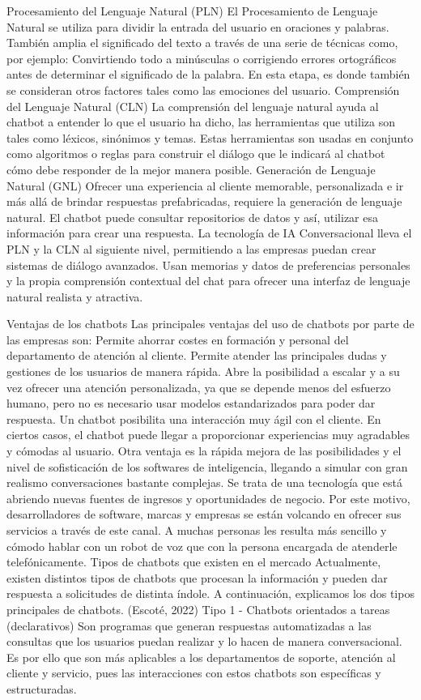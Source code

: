 Procesamiento del Lenguaje Natural (PLN)
El Procesamiento de Lenguaje Natural se utiliza para dividir la entrada del usuario en oraciones y palabras. También amplia el significado del texto a través de una serie de técnicas como, por ejemplo: Convirtiendo todo a minúsculas o corrigiendo errores ortográficos antes de determinar el significado de la palabra. En esta etapa, es donde también se consideran otros factores tales como las emociones del usuario.
Comprensión del Lenguaje Natural (CLN)
La comprensión del lenguaje natural ayuda al chatbot a entender lo que el usuario ha dicho, las herramientas que utiliza son tales como léxicos, sinónimos y temas. Estas herramientas son usadas en conjunto como algoritmos o reglas para construir el diálogo que le indicará al chatbot cómo debe responder de la mejor manera posible.
Generación de Lenguaje Natural (GNL)
Ofrecer una experiencia al cliente memorable, personalizada e ir más allá de brindar respuestas prefabricadas, requiere la generación de lenguaje natural. El chatbot puede consultar repositorios de datos y así, utilizar esa información para crear una respuesta.
La tecnología de IA Conversacional lleva el PLN y la CLN al siguiente nivel, permitiendo a las empresas puedan crear sistemas de diálogo avanzados.
Usan memorias y datos de preferencias personales y la propia comprensión contextual del chat para ofrecer una interfaz de lenguaje natural realista y atractiva.

Ventajas de los chatbots
Las principales ventajas del uso de chatbots por parte de las empresas son:
Permite ahorrar costes en formación y personal del departamento de atención al cliente.
Permite atender las principales dudas y gestiones de los usuarios de manera rápida.
Abre la posibilidad a escalar y a su vez ofrecer una atención personalizada, ya que se depende menos del esfuerzo humano, pero no es necesario usar modelos estandarizados para poder dar respuesta.
Un chatbot posibilita una interacción muy ágil con el cliente.
En ciertos casos, el chatbot puede llegar a proporcionar experiencias muy agradables y cómodas al usuario.
Otra ventaja es la rápida mejora de las posibilidades y el nivel de sofisticación de los softwares de inteligencia, llegando a simular con gran realismo conversaciones bastante complejas.
Se trata de una tecnología que está abriendo nuevas fuentes de ingresos y oportunidades de negocio. Por este motivo, desarrolladores de software, marcas y empresas se están volcando en ofrecer sus servicios a través de este canal.
A muchas personas les resulta más sencillo y cómodo hablar con un robot de voz que con la persona encargada de atenderle telefónicamente.
Tipos de chatbots que existen en el mercado
Actualmente, existen distintos tipos de chatbots que procesan la información y pueden dar respuesta a solicitudes de distinta índole. A continuación, explicamos los dos tipos principales de chatbots. (Escoté, 2022)
Tipo 1 - Chatbots orientados a tareas (declarativos)
Son programas que generan respuestas automatizadas a las consultas que los usuarios puedan realizar y lo hacen de manera conversacional. Es por ello que son más aplicables a los departamentos de soporte, atención al cliente y servicio, pues las interacciones con estos chatbots son específicas y estructuradas.

